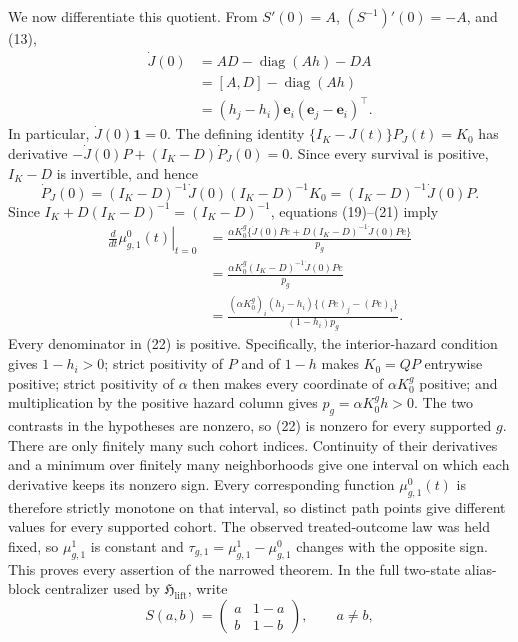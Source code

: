 We now differentiate this quotient. From \(S'(0)=A\), \((S^{-1})'(0)=-A\), and (13),
\[
\begin{aligned}
 \dot J(0)
 &=AD-\operatorname{diag}(Ah)-DA\\
 &=[A,D]-\operatorname{diag}(Ah)\\
 &=(h_j-h_i)\mathbf e_i(\mathbf e_j-\mathbf e_i)^{\top}.
                                                                    \tag{20}
\end{aligned}
\]
In particular, \(\dot J(0)\mathbf 1=0\). The defining identity \(\{I_K-J(t)\}P_J(t)=K_0\) has derivative \(-\dot J(0)P+(I_K-D)\dot P_J(0)=0\). Since every survival is positive, \(I_K-D\) is invertible, and hence
\[
 \dot P_J(0)=(I_K-D)^{-1}\dot J(0)(I_K-D)^{-1}K_0
 =(I_K-D)^{-1}\dot J(0)P.                                    \tag{21}
\]
Since \(I_K+D(I_K-D)^{-1}=(I_K-D)^{-1}\), equations (19)--(21) imply
\[
\begin{aligned}
 \left.\frac{d}{dt}\mu^0_{g,1}(t)\right|_{t=0}
 &=\frac{\alpha K_0^g\{\dot J(0)Pe+D(I_K-D)^{-1}\dot J(0)Pe\}}{p_g}\\
 &=\frac{\alpha K_0^g(I_K-D)^{-1}\dot J(0)Pe}{p_g}\\
 &=\frac{(\alpha K_0^g)_i(h_j-h_i)\{(Pe)_j-(Pe)_i\}}
 {(1-h_i)p_g}.                                                  \tag{22}
\end{aligned}
\]
Every denominator in (22) is positive. Specifically, the interior-hazard condition gives \(1-h_i>0\); strict positivity of \(P\) and of \(1-h\) makes \(K_0=QP\) entrywise positive; strict positivity of \(\alpha\) then makes every coordinate of \(\alpha K_0^g\) positive; and multiplication by the positive hazard column gives \(p_g=\alpha K_0^gh>0\). The two contrasts in the hypotheses are nonzero, so (22) is nonzero for every supported \(g\). There are only finitely many such cohort indices. Continuity of their derivatives and a minimum over finitely many neighborhoods give one interval on which each derivative keeps its nonzero sign. Every corresponding function \(\mu^0_{g,1}(t)\) is therefore strictly monotone on that interval, so distinct path points give different values for every supported cohort. The observed treated-outcome law was held fixed, so \(\mu^1_{g,1}\) is constant and \(\tau_{g,1}=\mu^1_{g,1}-\mu^0_{g,1}\) changes with the opposite sign. This proves every assertion of the narrowed theorem.
In the full two-state alias-block centralizer used by \(\mathfrak H_{\mathrm{lift}}\), write
\[
 S(a,b)=\begin{pmatrix}a&1-a\\ b&1-b\end{pmatrix},\qquad a\ne b,
\]
